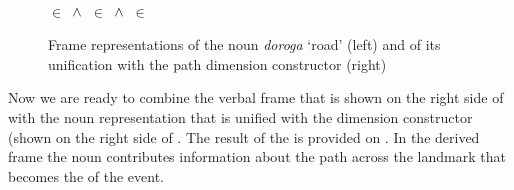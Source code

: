 \begin{figure}\small
\hfill%
\hfill%
\begin{minipage}{0.275\textwidth}
\smallskip\\
 $\in$  $\,\wedge\,$  $\in$  $\,\wedge\,$  $\in$ 
\end{minipage}
\caption{Frame representations of the noun \textit{doroga} `road' (left) and of its unification with the path dimension constructor (right) \label{frame:road}}
\end{figure}

Now we are ready to combine the verbal frame that is shown on the right side of  with the noun representation that is unified with the dimension constructor (shown on the right side of . The result of the  is provided on . In the derived frame the noun contributes information about the path across the landmark that becomes the  of the event.

